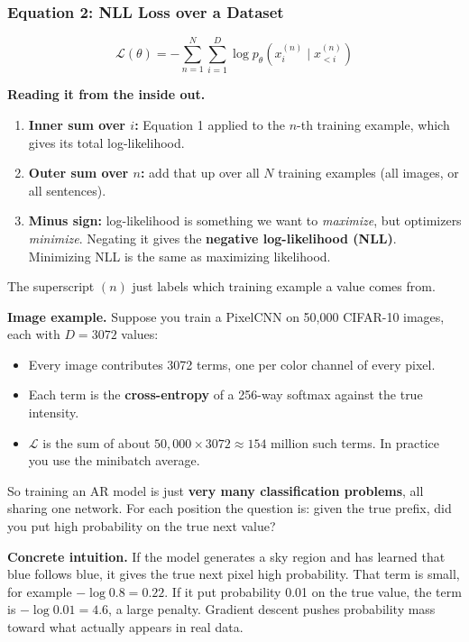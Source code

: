 \subsubsection*{Equation 2: NLL Loss over a Dataset}

$$\mathcal{L}(\theta) = -\sum_{n=1}^{N} \sum_{i=1}^{D} \log p_\theta\!\left(x_i^{(n)} \mid x_{<i}^{(n)}\right)$$

\textbf{Reading it from the inside out.}
\begin{enumerate}
  \item \textbf{Inner sum over $i$:} Equation 1 applied to the $n$-th training example, which gives its total log-likelihood.
  \item \textbf{Outer sum over $n$:} add that up over all $N$ training examples (all images, or all sentences).
  \item \textbf{Minus sign:} log-likelihood is something we want to \textit{maximize}, but optimizers \textit{minimize}. Negating it gives the \textbf{negative log-likelihood (NLL)}. Minimizing NLL is the same as maximizing likelihood.
\end{enumerate}
The superscript $(n)$ just labels which training example a value comes from.

\textbf{Image example.} Suppose you train a PixelCNN on 50,000 CIFAR-10 images, each with $D = 3072$ values:
\begin{itemize}
  \item Every image contributes 3072 terms, one per color channel of every pixel.
  \item Each term is the \textbf{cross-entropy} of a 256-way softmax against the true intensity.
  \item $\mathcal{L}$ is the sum of about $50{,}000 \times 3072 \approx 154$ million such terms. In practice you use the minibatch average.
\end{itemize}

So training an AR model is just \textbf{very many classification problems}, all sharing one network. For each position the question is: given the true prefix, did you put high probability on the true next value?

\textbf{Concrete intuition.} If the model generates a sky region and has learned that blue follows blue, it gives the true next pixel high probability. That term is small, for example $-\log 0.8 = 0.22$. If it put probability 0.01 on the true value, the term is $-\log 0.01 = 4.6$, a large penalty. Gradient descent pushes probability mass toward what actually appears in real data.

